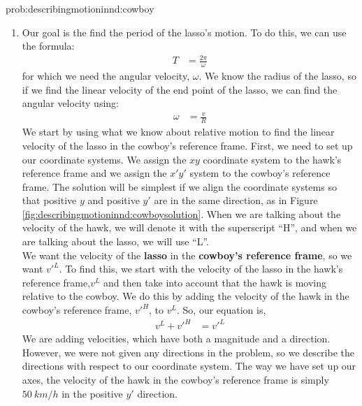 \newpage
\begin{solution}{prob:describingmotioninnd:cowboy}\label{soln:describingmotioninnd:cowboy}
\begin{enumerate}[label=\alph*)]
\item Our goal is the find the period of the lasso's motion. To do this, we can use the formula: 
\begin{align*}
T&=\frac{2\pi}{\omega}
\end{align*}
for which we need the angular velocity, $\omega$. We know the radius of the lasso, so if we find the linear velocity of the end point of the lasso, we can find the angular velocity using:
\begin{align*}
\omega&=\frac{v}{R}
\end{align*}
We start by using what we know about relative motion to find the linear velocity of the lasso in the cowboy's reference frame. First, we need to set up our coordinate systems. We assign the $xy$ coordinate system to the hawk's reference frame and we assign the $x'y'$ system to the cowboy's reference frame. The solution will be simplest if we align the coordinate systems so that positive $y$ and positive $y'$ are in the same direction, as in Figure \ref{fig:describingmotioninnd:cowboysolution}. When we are talking about the velocity of the hawk, we will denote it with the superscript ``H'', and when we are talking about the lasso, we will use ``L''.\\

We want the velocity of the \textbf{lasso} in the \textbf{cowboy's reference frame}, so we want $v'^L$. To find this, we start with the velocity of the lasso in the hawk's reference frame,$v^L$ and then take into account that the hawk is moving relative to the cowboy. We do this by adding the velocity of the hawk in the cowboy's reference frame, $v'^H$, to $v^L$. So, our equation is,
\begin{align*}
v^L+v'^H&=v'^L
\end{align*}
We are adding velocities, which have both a magnitude and a direction. However, we were not given any directions in the problem, so we describe the directions with respect to our coordinate system. The way we have set up our axes, the velocity of the hawk in the cowboy's reference frame is simply $\SI{50}{km/h}$ in the positive $y'$ direction.\\


\end{enumerate}
\end{solution}
